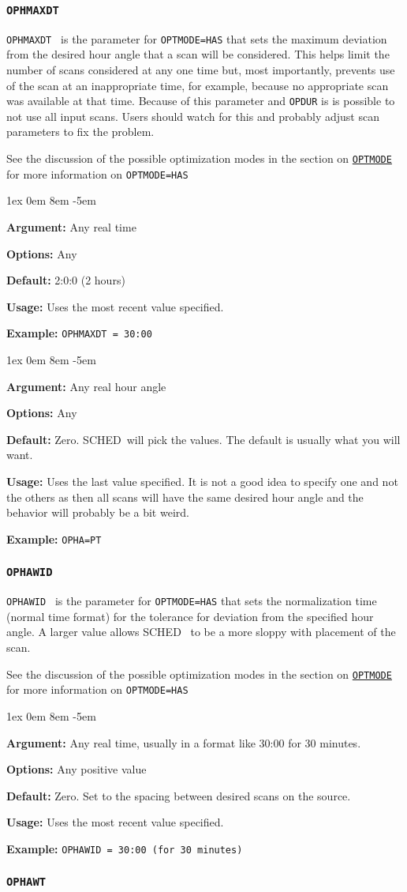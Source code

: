 \documentclass{report}
\newcommand{\schedb}{{\sc SCHED~}}
\newcommand{\rcwbox}[5]{
  \begin{list}{}{\parsep 1ex  \itemsep 0em
                 \leftmargin 8em  \itemindent -5em }
    \item {\bf Argument:} #1
    \item {\bf Options:}  #2
    \item {\bf Default:}  #3
    \item {\bf Usage:}    #4
    \item {\bf Example:}  #5
  \end{list}
}
\begin{document}
\subsubsection{\label{MP:OPHMAXDT}{\tt OPHMAXDT}}

{\tt OPHMAXDT } is the parameter for {\tt OPTMODE=HAS} that sets
the maximum deviation from the desired hour angle that a scan will
be considered.  This helps limit the number of scans considered at
any one time but, most importantly, prevents use of the scan at an
inappropriate time, for example, because no appropriate scan was
available at that time.  Because of this parameter and {\tt OPDUR}
is is possible to not use all input scans.  Users should watch for
this and probably adjust scan parameters to fix the problem.

See the discussion of the possible optimization modes in the section
on 
{\hyperref[MP:OPTMODE]{{\tt OPTMODE}}} for more information on
{\tt OPTMODE=HAS}

\rcwbox
{Any real time}
{Any}
{2:0:0 (2 hours)}
{Uses the most recent value specified.}
{{\tt OPHMAXDT = 30:00 }}

\rcwbox
{Any real hour angle}
{Any}
{Zero.  \schedb will pick the values.  The default is usually what you
will want.}
{Uses the last value specified.  It is not a good idea to specify one
and not the others as then all scans will have the same desired hour
angle and the behavior will probably be a bit weird.}
{{\tt OPHA=PT }}

\subsubsection{\label{MP:OPHAWID}{\tt OPHAWID}}

{\tt OPHAWID } is the parameter for {\tt OPTMODE=HAS} that sets the
normalization time (normal time format) for the tolerance for
deviation from the specified hour angle.  A larger value allows \schedb
to be a more sloppy with placement of the scan.

See the discussion of the possible optimization modes in the section
on 
{\hyperref[MP:OPTMODE]{{\tt OPTMODE}}} for more information on
{\tt OPTMODE=HAS}

\rcwbox
{Any real time, usually in a format like 30:00 for 30 minutes.}
{Any positive value}
{Zero.  Set to the spacing between desired scans on the source.}
{Uses the most recent value specified.}
{{\tt OPHAWID = 30:00 (for 30 minutes)}}

\subsubsection{\label{MP:OPHAWT}{\tt OPHAWT}}
\end{document}
